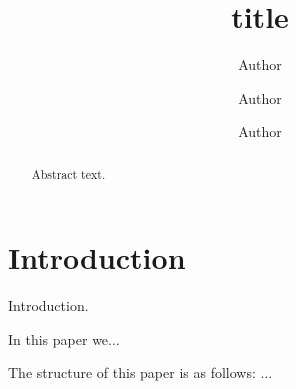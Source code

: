 \documentclass[twocolumn]{aastex62}
\begin{document}

\title{title}


\author[ORCID]{Author}

\author[ORCID]{Author}

\author[ORCID]{Author}



\begin{abstract}

Abstract text. 

\end{abstract}

\tableofcontents


\section{Introduction} \label{sec:intro}

Introduction.

In this paper we... 

The structure of this paper is as follows: ...

\end{document}
